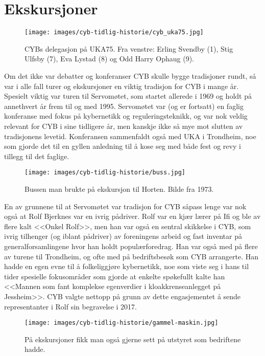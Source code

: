 \section{Ekskursjoner}

\begin{figure}
	\texttt{[image: images/cyb-tidlig-historie/cyb\_uka75.jpg]}
	\label{fig:cyb-uka75}
	\caption{CYBs delegasjon på UKA75. Fra venstre: Erling Svendby (1), Stig Ulfsby (7), Eva Lystad (8) og Odd Harry Ophaug (9).}
\end{figure}

Om det ikke var debatter og konferanser CYB skulle bygge tradisjoner rundt, så var i alle fall turer og ekskursjoner en viktig tradisjon for CYB i mange år. Spesielt viktig var turen til Servomøtet, som startet allerede i 1969 og holdt på annethvert år frem til og med 1995. Servomøtet var (og er fortsatt) en faglig konferanse med fokus på kybernetikk og reguleringsteknikk, og var nok veldig relevant for CYB i sine tidligere år, men kanskje ikke så mye mot slutten av tradisjonens levetid. Konferansen sammenfaldt også med UKA i Trondheim, noe som gjorde det til en gyllen anledning til å kose seg med både fest og revy i tillegg til det faglige.

\begin{wrapfigure}{r}{7cm}
	\vspace{-20pt}
	\centering
	\texttt{[image: images/cyb-tidlig-historie/buss.jpg]}
	\label{fig:buss}
	\caption{Bussen man brukte på ekskursjon til Horten. Bilde fra 1973.}
\end{wrapfigure}

En av grunnene til at Servomøtet var tradisjon for CYB såpass lenge var nok også at Rolf Bjerknes var en ivrig pådriver. Rolf var en kjær lærer på Ifi og ble av flere kalt <<Onkel Rolf>>, men han var også en sentral skikkelse i CYB, som ivrig tilhenger (og iblant pådriver) av foreningens arbeid og fast inventar på generalforsamlingene hvor han holdt populærforedrag. Han var også med på flere av turene til Trondheim, og ofte med på bedriftsbesøk som CYB arrangerte. Han hadde en egen evne til å folkeliggjøre kybernetikk, noe som viste seg i hans til tider spesielle fokusområder som gjorde at enkelte spøkefullt kalte han <<Mannen som fant komplekse egenverdier i kloakkrenseanlegget på Jessheim>>. CYB valgte nettopp på grunn av dette engasjementet å sende representanter i Rolf sin begravelse i 2017.

\begin{wrapfigure}{l}{7cm}
	\vspace{-20pt}
	\centering
	\texttt{[image: images/cyb-tidlig-historie/gammel-maskin.jpg]}
	\label{fig:gammel-maskin}
	\caption{På ekskursjoner fikk man også gjerne sett på utstyret som bedriftene hadde.}
\end{wrapfigure}

